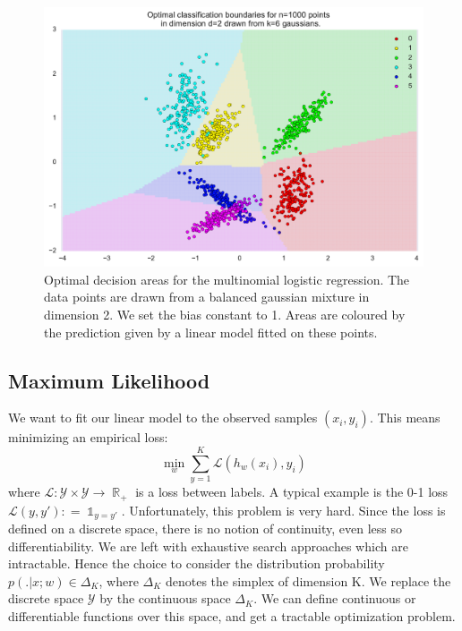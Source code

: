 \documentclass{article}
\DeclareMathOperator{\R}{\mathbb{R}}
\DeclareMathOperator{\1}{\mathbb{1}}
\begin{document}
\begin{figure}[ht]
	\label{linear classification}
	\includegraphics[width=\textwidth]{images/linear_classification.pdf}
	\caption{
	Optimal decision areas for the multinomial logistic regression.
	The data points are drawn from a balanced gaussian mixture in dimension 2.
	We set the bias constant to 1.
	Areas are coloured by the prediction given by a linear model fitted on these points. 
	}
\end{figure}



 \subsection{Maximum Likelihood}

We want to fit our linear model to the observed samples $(x_i, y_i)$.
This means minimizing an empirical loss:
\begin{equation}
	\min_w \sum_{y=1}^K \mathcal L (h_w(x_i),y_i)
\end{equation}
where $\mathcal L: \mathcal Y \times \mathcal Y \rightarrow \R_+$ is a loss between labels.
A typical example is the 0-1 loss $\mathcal L(y, y') : = \1_{y=y'}$.
Unfortunately, this problem is very hard.
Since the loss is defined on a discrete space, there is no notion of continuity, even less so differentiability.
We are left with exhaustive search approaches which are intractable.
Hence the choice to consider the distribution probability $p( . | x ; w) \in \Delta_K$, where $\Delta_K$ denotes the simplex of dimension K.
We replace the discrete space $\mathcal Y$ by the continuous space $\Delta_K$.
We can define continuous or differentiable functions over this space, and get a tractable optimization problem.
 
\end{document}
